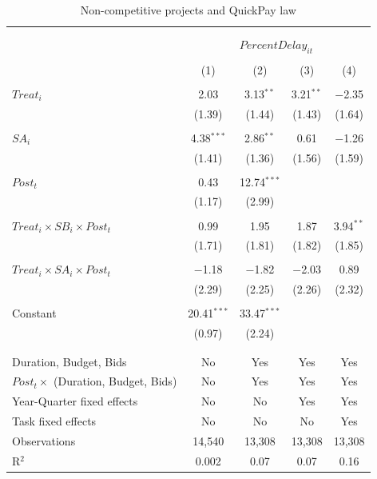 \documentclass[
]{article}
\begin{document}
\begin{table}[H] \centering 
  \caption{Non-competitive projects and QuickPay law} 
  \label{} 
\small 
\begin{tabular}{@{\extracolsep{-2pt}}lcccc} 
\\[-1.8ex]\hline 
\hline \\[-1.8ex] 
\\[-1.8ex] & \multicolumn{4}{c}{$PercentDelay_{it}$  } \\ 
\\[-1.8ex] & (1) & (2) & (3) & (4)\\ 
\hline \\[-1.8ex] 
 $Treat_i$ & 2.03 & 3.13$^{**}$ & 3.21$^{**}$ & $-$2.35 \\ 
  & (1.39) & (1.44) & (1.43) & (1.64) \\ 
  & & & & \\ 
 $SA_i$ & 4.38$^{***}$ & 2.86$^{**}$ & 0.61 & $-$1.26 \\ 
  & (1.41) & (1.36) & (1.56) & (1.59) \\ 
  & & & & \\ 
 $Post_t$ & 0.43 & 12.74$^{***}$ &  &  \\ 
  & (1.17) & (2.99) &  &  \\ 
  & & & & \\ 
 $Treat_i \times SB_i \times Post_t$ & 0.99 & 1.95 & 1.87 & 3.94$^{**}$ \\ 
  & (1.71) & (1.81) & (1.82) & (1.85) \\ 
  & & & & \\ 
 $Treat_i \times SA_i \times Post_t$ & $-$1.18 & $-$1.82 & $-$2.03 & 0.89 \\ 
  & (2.29) & (2.25) & (2.26) & (2.32) \\ 
  & & & & \\ 
 Constant & 20.41$^{***}$ & 33.47$^{***}$ &  &  \\ 
  & (0.97) & (2.24) &  &  \\ 
  & & & & \\ 
\hline \\[-1.8ex] 
Duration, Budget, Bids & No & Yes & Yes & Yes \\ 
$Post_t \times $  (Duration, Budget, Bids) & No & Yes & Yes & Yes \\ 
Year-Quarter fixed effects & No & No & Yes & Yes \\ 
Task fixed effects & No & No & No & Yes \\ 
Observations & 14,540 & 13,308 & 13,308 & 13,308 \\ 
R$^{2}$ & 0.002 & 0.07 & 0.07 & 0.16 \\ 

\end{tabular}
\end{table}
\end{document}
